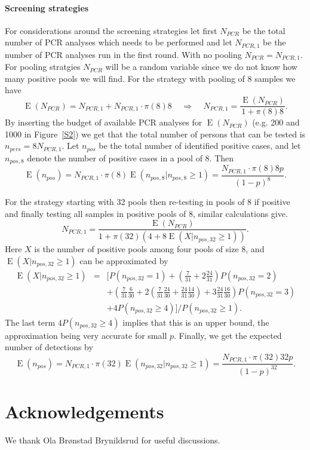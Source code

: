 \documentclass[10pt]{article}
\DeclareMathOperator{\E}{E}
\begin{document}
\paragraph*{Screening strategies}
For considerations around the screening strategies let first $N_{PCR}$ be the total number of PCR analyses which needs to be performed and let $N_{PCR,1}$ be the number of PCR analyses run in the first round. With no pooling $N_{PCR}=N_{PCR,1}$. For pooling stratgies $N_{PCR}$ will be a random variable since we do not know how many positive pools we will find. For the strategy with pooling of 8 samples we have
$$
\E(N_{PCR})=N_{PCR,1}+N_{PCR,1}\cdot\pi(8) 8 
\;\;\;\;  \Rightarrow  \;\;\;\;
N_{PCR,1}=\frac{\E(N_{PCR})}{1+\pi(8) 8}. 
$$
By inserting the budget of available PCR analyses for $\E(N_{PCR})$ (e.g. 200 and 1000 in Figure~\ref{S2}) we get that the total number of persons that can be tested is $n_{pers}=8N_{PCR,1}$. Let $n_{pos}$ be the total number of identified positive cases, and let $n_{pos,8}$ denote the number of positive cases in a pool of 8. Then
$$
\E(n_{pos})=N_{PCR,1}\cdot\pi(8)\E(n_{pos,8}|n_{pos,8}\geq 1)=\frac{N_{PCR,1}\cdot \pi(8) 8 p}{(1-p)^8}.
$$  

For the strategy starting with 32 pools then re-testing in pools of 8 if positive and finally testing all samples in positive pools of 8, similar calculations give. 
$$
N_{PCR,1}=\frac{\E(N_{PCR})}{1+\pi(32) (4+8 \E(X|n_{pos,32}\geq 1))}.  
$$
Here $X$ is the number of positive pools among four pools of size 8, and $\E(X|n_{pos,32}\geq 1)$ can be approximated by
\begin{eqnarray*}
\E(X|n_{pos,32}\geq 1) &=& [P(n_{pos,32}=1)+(\frac{7}{31}+2\frac{24}{31})P(n_{pos,32}=2)  \\
&& +(\frac{7}{31}\frac{6}{30}+2(\frac{7}{31}\frac{24}{30}+\frac{24}{31}\frac{14}{30})+3\frac{24}{31}\frac{16}{30})P(n_{pos,32}=3)\\
&& +4P(n_{pos,32}\geq 4) ]/P(n_{pos,32}\geq 1).
\end{eqnarray*}
The last term $4P(n_{pos,32}\geq 4)$ implies that this is an upper bound, the approximation being very accurate for small $p$. Finally, we get the expected number of detections by
$$
\E(n_{pos})=N_{PCR,1}\cdot\pi(32)\E(n_{pos,32}|n_{pos,32}\geq 1)=\frac{N_{PCR,1}\cdot \pi(32) 32 p}{(1-p)^{32}}.
$$  
\section*{Acknowledgements}
We thank Ola Brønstad Brynildsrud for useful discussions.
{}
\end{document}
